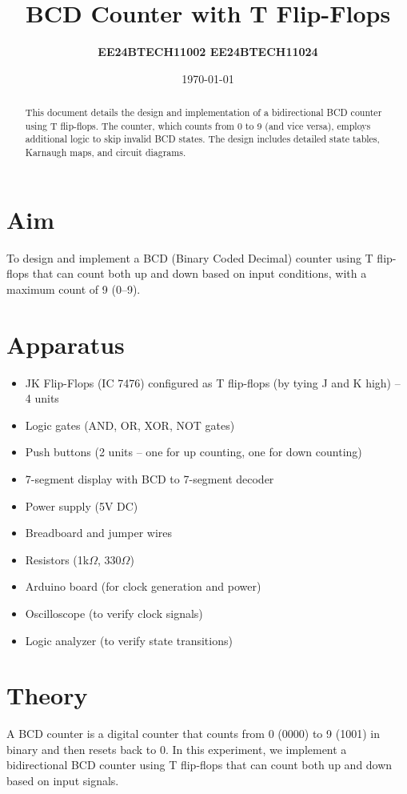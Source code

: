 \documentclass[12pt]{article}
\title{\textbf{BCD Counter with T Flip-Flops}}
\author{\textbf{EE24BTECH11002 EE24BTECH11024}}
\date{\today}
\begin{document}
\maketitle
\thispagestyle{fancy}

\begin{abstract}
This document details the design and implementation of a bidirectional BCD counter using T flip-flops. The counter, which counts from 0 to 9 (and vice versa), employs additional logic to skip invalid BCD states. The design includes detailed state tables, Karnaugh maps, and circuit diagrams.
\end{abstract}

\section*{Aim}
To design and implement a BCD (Binary Coded Decimal) counter using T flip-flops that can count both up and down based on input conditions, with a maximum count of 9 (0--9).

\section*{Apparatus}
\begin{itemize}
    \item JK Flip-Flops (IC 7476) configured as T flip-flops (by tying J and K high) -- 4 units
    \item Logic gates (AND, OR, XOR, NOT gates)
    \item Push buttons (2 units -- one for up counting, one for down counting)
    \item 7-segment display with BCD to 7-segment decoder
    \item Power supply (5V DC)
    \item Breadboard and jumper wires
    \item Resistors (1k$\Omega$, 330$\Omega$)
    \item Arduino board (for clock generation and power)
    \item Oscilloscope (to verify clock signals)
    \item Logic analyzer (to verify state transitions)
\end{itemize}

\section*{Theory}
A BCD counter is a digital counter that counts from 0 (0000) to 9 (1001) in binary and then resets back to 0. In this experiment, we implement a bidirectional BCD counter using T flip-flops that can count both up and down based on input signals.
\end{document}
